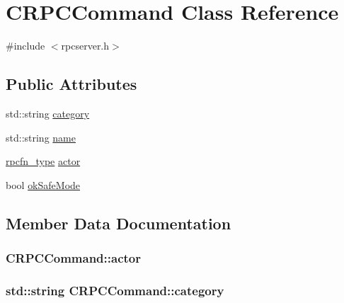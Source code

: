 \hypertarget{class_c_r_p_c_command}{}\section{C\+R\+P\+C\+Command Class Reference}
\label{class_c_r_p_c_command}


{\ttfamily \#include $<$rpcserver.\+h$>$}

\subsection*{Public Attributes}
\begin{DoxyCompactItemize}
\item 
std\+::string \hyperlink{class_c_r_p_c_command_a27dd2710a5f94011f891f6a2efcec53a}{category}
\item 
std\+::string \hyperlink{class_c_r_p_c_command_a8da584c0d2d98be22ebff74d3cf2221c}{name}
\item 
\hyperlink{rpcserver_8h_a55410ecf7b981d238edda579f8c97040}{rpcfn\+\_\+type} \hyperlink{class_c_r_p_c_command_a197a7eba565b4d9673537655fcbc1344}{actor}
\item 
bool \hyperlink{class_c_r_p_c_command_a7f0b10e619917a3019f36ba5fa538adb}{ok\+Safe\+Mode}
\end{DoxyCompactItemize}


\subsection{Member Data Documentation}
\hypertarget{class_c_r_p_c_command_a197a7eba565b4d9673537655fcbc1344}{}
\subsubsection[{actor}]{ C\+R\+P\+C\+Command\+::actor}\label{class_c_r_p_c_command_a197a7eba565b4d9673537655fcbc1344}
\hypertarget{class_c_r_p_c_command_a27dd2710a5f94011f891f6a2efcec53a}{}
\subsubsection[{category}]{\setlength{\rightskip}{0pt plus 5cm}std\+::string C\+R\+P\+C\+Command\+::category}\label{class_c_r_p_c_command_a27dd2710a5f94011f891f6a2efcec53a}
\hypertarget{class_c_r_p_c_command_a8da584c0d2d98be22ebff74d3cf2221c}{}
